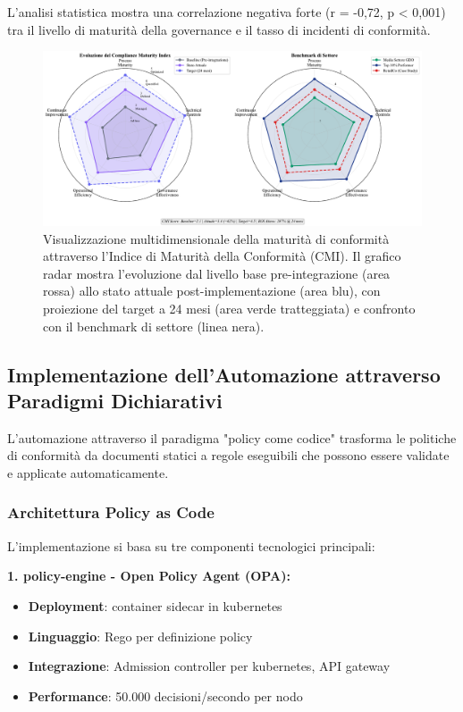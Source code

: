 L'analisi statistica mostra una correlazione negativa forte (r = -0,72, p < 0,001) tra il livello di maturità della \gls{governance} e il tasso di incidenti di conformità.

\begin{figure}[htbp]
\centering
\includegraphics[width=\textwidth]{thesis_figures/cap4/figura_4_2_cmi_radar.pdf}
\caption{Visualizzazione multidimensionale della maturità di conformità attraverso l'Indice di Maturità della Conformità (CMI). Il grafico radar mostra l'evoluzione dal livello base pre-integrazione (area rossa) allo stato attuale post-implementazione (area blu), con proiezione del target a 24 mesi (area verde tratteggiata) e confronto con il benchmark di settore (linea nera).}
\label{fig:cmi_radar}
\end{figure}

\subsection{\texorpdfstring{Implementazione dell'Automazione attraverso Paradigmi Dichiarativi}{4.4.2 - Implementazione dell'Automazione attraverso Paradigmi Dichiarativi}}

L'automazione attraverso il paradigma "policy come codice" trasforma le politiche di conformità da documenti statici a regole eseguibili che possono essere validate e applicate automaticamente\autocite{Brynjolfsson2016}.

\subsubsection{\texorpdfstring{Architettura Policy as Code}{4.4.2.1 - Architettura Policy as Code}}

L'implementazione si basa su tre componenti tecnologici principali:

\textbf{1. \gls{policy-engine} - Open Policy Agent (OPA):}
\begin{itemize}
    \item \textbf{Deployment}: \gls{container} sidecar in \gls{kubernetes}
    \item \textbf{Linguaggio}: Rego per definizione policy
    \item \textbf{Integrazione}: Admission controller per \gls{kubernetes}, API gateway
    \item \textbf{Performance}: 50.000 decisioni/secondo per nodo
\end{itemize}

